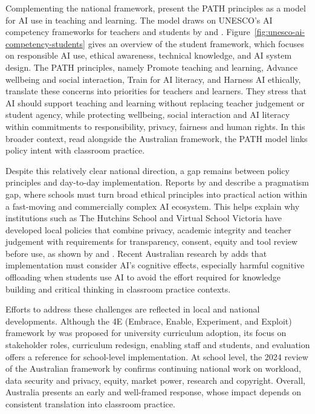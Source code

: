 Complementing the national framework, \cite{brazil2025path} present the PATH
principles as a model for AI use in teaching and learning. The model draws on
UNESCO's AI competency frameworks for teachers and students by
\cite{miao2024aiteachers} and \cite{miao2024aistudents}.
Figure~\ref{fig:unesco-ai-competency-students} gives an overview of the student
framework, which focuses on responsible AI use, ethical awareness, technical
knowledge, and AI system design. The PATH principles, namely Promote teaching and
learning, Advance wellbeing and social interaction, Train for AI literacy, and
Harness AI ethically, translate these concerns into priorities for teachers and
learners. They stress that AI should support teaching and learning without replacing
teacher judgement or student agency, while protecting wellbeing, social interaction
and AI literacy within commitments to responsibility, privacy, fairness and human
rights. In this broader context, read alongside the Australian framework, the PATH
model links policy intent with classroom practice.

Despite this relatively clear national direction, a gap remains between policy
principles and day-to-day implementation. Reports by \cite{edsafe2023aiaustralia} and
\cite{knight2023generative} describe a pragmatism gap, where schools must turn broad
ethical principles into practical action within a fast-moving and commercially
complex AI ecosystem. This helps explain why institutions such as The Hutchins School
and Virtual School Victoria have developed local policies that combine privacy,
academic integrity and teacher judgement with requirements for transparency, consent,
equity and tool review before use, as shown by \cite{hutchins2025genai} and
\cite{vsv2025aipolicy}. Recent Australian research by \cite{lodge2023aioffloading}
adds that implementation must consider AI's cognitive effects, especially harmful
cognitive offloading when students use AI to avoid the effort required for knowledge
building and critical thinking in classroom practice contexts.

Efforts to address these challenges are reflected in local and national developments.
Although the 4E (Embrace, Enable, Experiment, and Exploit) framework by
\cite{shailendra2024framework} was proposed for university curriculum adoption, its
focus on stakeholder roles, curriculum redesign, enabling staff and students, and
evaluation offers a reference for school-level implementation. At school level, the
2024 review of the Australian framework by \cite{taskforce2025review} confirms
continuing national work on workload, data security and privacy, equity, market
power, research and copyright. Overall, Australia presents an early and well-framed
response, whose impact depends on consistent translation into classroom practice.

